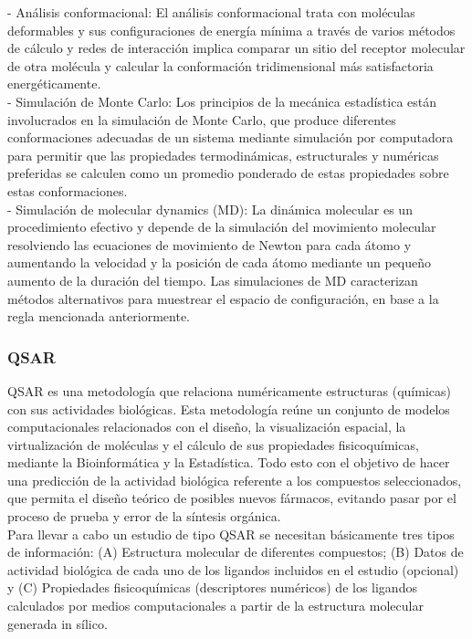 - Análisis conformacional: El análisis conformacional trata con moléculas deformables y sus configuraciones de energía mínima a través de varios métodos de cálculo y redes de interacción implica comparar un sitio del receptor molecular de otra molécula y calcular la conformación tridimensional más satisfactoria energéticamente.\\

- Simulación de Monte Carlo: Los principios de la mecánica estadística están involucrados en la simulación de Monte Carlo, que produce diferentes conformaciones adecuadas de un sistema mediante simulación por computadora para permitir que las propiedades termodinámicas, estructurales y numéricas preferidas se calculen como un promedio ponderado de estas propiedades sobre estas conformaciones.\\

- Simulación de molecular dynamics (MD): La dinámica molecular es un procedimiento efectivo y depende de la simulación del movimiento molecular resolviendo las ecuaciones de movimiento de Newton para cada átomo y aumentando la velocidad y la posición de cada átomo mediante un pequeño aumento de la duración del tiempo. Las simulaciones de MD caracterizan métodos alternativos para muestrear el espacio de configuración, en base a la regla mencionada anteriormente.\\

\subsubsection{QSAR}
\noindent QSAR es una metodología  que relaciona numéricamente estructuras (químicas) con sus actividades biológicas. Esta metodología reúne un conjunto de modelos computacionales relacionados con el diseño, la visualización espacial, la virtualización de moléculas y el cálculo de sus propiedades fisicoquímicas, mediante la Bioinformática y la Estadística. Todo esto con el objetivo de hacer una predicción de la actividad biológica referente a los compuestos seleccionados, que permita el diseño teórico de posibles nuevos fármacos, evitando pasar por el proceso de prueba y error de la síntesis orgánica.\\

\noindent Para llevar a cabo un estudio de tipo QSAR se necesitan básicamente tres tipos de información: (A) Estructura molecular de diferentes compuestos; (B) Datos de actividad biológica de cada uno de los ligandos incluidos en el estudio (opcional) y (C) Propiedades fisicoquímicas (descriptores numéricos) de los ligandos calculados por medios computacionales a partir de la estructura molecular generada in sílico.\cite{7}\\


